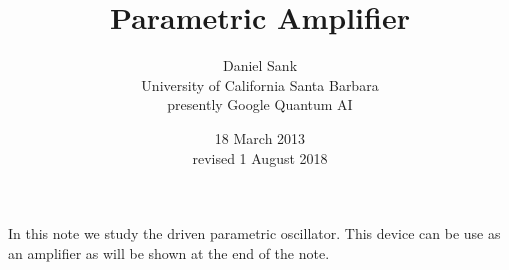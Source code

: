 \documentclass{article}
\title{Parametric Amplifier}
\author{Daniel Sank\\
\small{University of California Santa Barbara}\\
\small{presently Google Quantum AI}}
\date{18 March 2013\\ \small{revised 1 August 2018}}
\begin{document}
\maketitle

In this note we study the driven parametric oscillator.
This device can be use as an amplifier as will be shown at the end of the note.


\end{document}
